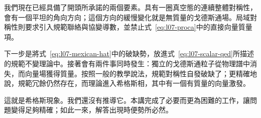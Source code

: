 我們現在已經具備了開頭所承諾的兩個要素。具有一圈真空態的連續整體對稱性，會有一個平坦的角向方向；這個方向的緩慢變化就是無質量的戈德斯通場。局域對稱性則要求引入規範聯絡與協變導數，並禁止式~\eqref{eq:l07-proca}中的直接向量質量項。

下一步是將式~\eqref{eq:l07-mexican-hat}中的破缺勢，放進式~\eqref{eq:l07-scalar-qed}所描述的規範不變理論中。接著會有兩件事同時發生：獨立的戈德斯通粒子從物理譜中消失，而向量場獲得質量。按照一般的教學說法，規範對稱性自發破缺了；更精確地說，規範冗餘仍然存在，而理論進入希格斯相，其中有一個有質量的向量激發。

這就是希格斯現象。我們還沒有推導它。本講完成了必要而更為困難的工作，讓問題變得足夠精確；如此一來，解答出現時便勢所必然。
